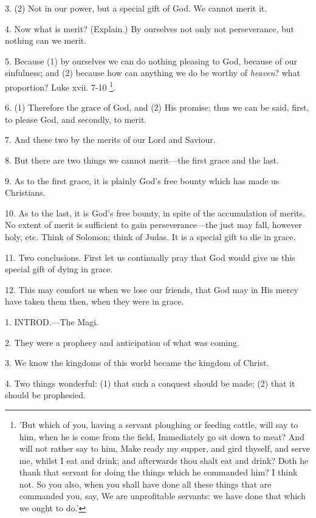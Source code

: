 3. (2) Not in our power, but a special gift of
God. We cannot merit it.

4. Now what is merit? (Explain.) By ourselves not
only not perseverance, but nothing can we merit.

5. Because (1) by ourselves we can do nothing
pleasing to God, because of our sinfulness; and (2) because how can
anything we do be worthy of \emph{heaven}? what proportion? Luke xvii.
7-10 \footnote{'But which of you,
having a servant ploughing or feeding cattle, will say to him, when he
is come from the field, Immediately go sit down to meat? And will not
rather say to him, Make ready my supper, and gird thyself, and serve
me, whilst I eat and drink; and afterwards thou shalt eat and drink?
Doth he thank that servant for doing the things which he commanded
him? I think not. So you also, when you shall have done all these
things that are commanded you, say, We are unprofitable servants: we
have done that which we ought to do.'}.

6. (1) Therefore the grace of God, and (2) His
promise; thus we can be said, first, to please God, and secondly, to
merit.

7. And these two by the merits of our Lord and
Saviour.

8. But there are two things we cannot merit—the
first grace and the last.

9. As to the first grace, it is plainly God's
free bounty which has made us Christians.

10. As to the last, it is God's free bounty, in
spite of the accumulation of merits. No extent of merit is sufficient
to gain perseverance—the just may fall, however holy, etc. Think of
Solomon; think of Judas. It is a special gift to die in grace.

11. Two conclusions. First let us continually
pray that God would give us this special gift of dying in grace.

12. This may comfort us when we lose our friends,
that God may in His mercy have taken them then, when they were in
grace.


1. INTROD.—The
Magi.

2. They were a prophecy and anticipation of what
was coming.

3. We know the kingdoms of this world became the
kingdom of Christ.

4. Two things wonderful: (1) that such a conquest
should be made; (2) that it should be prophesied.

